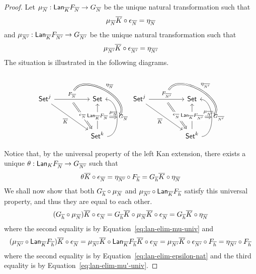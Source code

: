 \documentclass[acmsmall,review,anonymous]{acmart}
\theoremstyle{definition}
\begin{document}
\begin{proof}
Let $\mu_{\overline{N}} : \mathsf{Lan}_{\overline{K}} F_{\overline{N}} \to G_{\overline{N}}$ be the unique natural transformation such that
\begin{equation}\label{eq:lan-elim-mu-univ}
	\mu_{\overline{N}} \overline{K} \circ \epsilon_{\overline{N}} = \eta_{\overline{N}}
\end{equation}
and $\mu_{\overline{N'}} : \mathsf{Lan}_{\overline{K}} F_{\overline{N'}} \to G_{\overline{N'}}$ be the unique natural transformation such that
\begin{equation}\label{eq:lan-elim-mu'-univ}
	\mu_{\overline{N'}} \overline{K} \circ \epsilon_{\overline{N'}} = \eta_{\overline{N'}}
\end{equation}
The situation is illustrated in the following diagrams.
\[
\begin{tikzcd}[column sep = huge, row sep = huge]
\Set^j
\ar[r, "{F_{\ol N}}"{name=Fa}, ""{name=F, below}]
\ar[dr, "{\ol K}"']
&\Set \\
&\Set^k
\ar[Rightarrow, from=F, "{\epsilon_{\ol N}}" description]
\ar[u, "{\Lan_{\ol K} F_{\ol N}}"{name=L, description}]
\ar[u, bend right = 90, "{G_{\ol N}}"{name=G, right}, ""'{name=Gr, right}]
\ar[Rightarrow, bend left = 90, from=Fa, to=Gr, "{\eta_{\ol{N}}}"]
\ar[Rightarrow, from=L, to=G, "{\mu_{\ol N}}"]
\end{tikzcd}
\begin{tikzcd}[column sep = huge, row sep = huge]
\Set^j
\ar[r, "{F_{\ol{N'}}}"{name=Fa}, ""{name=F, below}]
\ar[dr, "{\ol K}"']
&\Set \\
&\Set^k
\ar[Rightarrow, from=F, "{\epsilon_{\ol{N'}}}" description]
\ar[u, "{\Lan_{\ol K} F_{\ol{N'}}}"{name=L, description}]
\ar[u, bend right = 90, "{G_{\ol{N'}}}"{name=G, right}, ""'{name=Gr, right}]
\ar[Rightarrow, bend left = 90, from=Fa, to=Gr, "{\eta_{\ol{N'}}}"]
\ar[Rightarrow, from=L, to=G, "{\mu_{\ol{N'}}}"]
\end{tikzcd}
\]

Notice that, by the universal property of the left Kan extension, there exists a unique $\theta : \mathsf{Lan}_K F_{\overline{N}} \to G_{\overline{N'}}$ such that
\[
	\theta \overline{K} \circ \epsilon_{\overline{N}} = \eta_{\overline{N'}} \circ F_{\overline{h}} = G_{\overline{h}} \overline{K} \circ \eta_{\overline{N}}
\]
We shall now show that both $G_{\overline{h}} \circ \mu_{\overline{N}}$ and $\mu_{\overline{N'}} \circ \mathsf{Lan}_{\overline{K}} F_{\overline{h}}$ satisfy this universal property, and thus they are equal to each other.
\[
	(G_{\overline{h}} \circ \mu_{\overline{N}}) \overline{K} \circ \epsilon_{\overline{N}}
	= G_{\overline{h}}\overline{K} \circ \mu_{\overline{N}} \overline{K} \circ \epsilon_{\overline{N}}
	= G_{\overline{h}}\overline{K} \circ \eta_{\overline{N}}
\]
where the second equality is by Equation~\ref{eq:lan-elim-mu-univ}
and
\[
	(\mu_{\overline{N'}} \circ \mathsf{Lan}_{\overline{K}} F_{\overline{h}}) \overline{K} \circ \epsilon_{\overline{N}}
	= \mu_{\overline{N'}}\overline{K} \circ \mathsf{Lan}_{\overline{K}} F_{\overline{h}}\overline{K} \circ \epsilon_{\overline{N}}
	= \mu_{\overline{N'}}\overline{K} \circ \epsilon_{\overline{N'}} \circ F_{\overline{h}}
	= \eta_{\overline{N'}} \circ F_{\overline{h}}
\]
where the second equality is by Equation~\ref{eq:lan-elim-epsilon-nat} and the third equality is by Equation~\ref{eq:lan-elim-mu'-univ}.


\end{proof}
\end{document}
